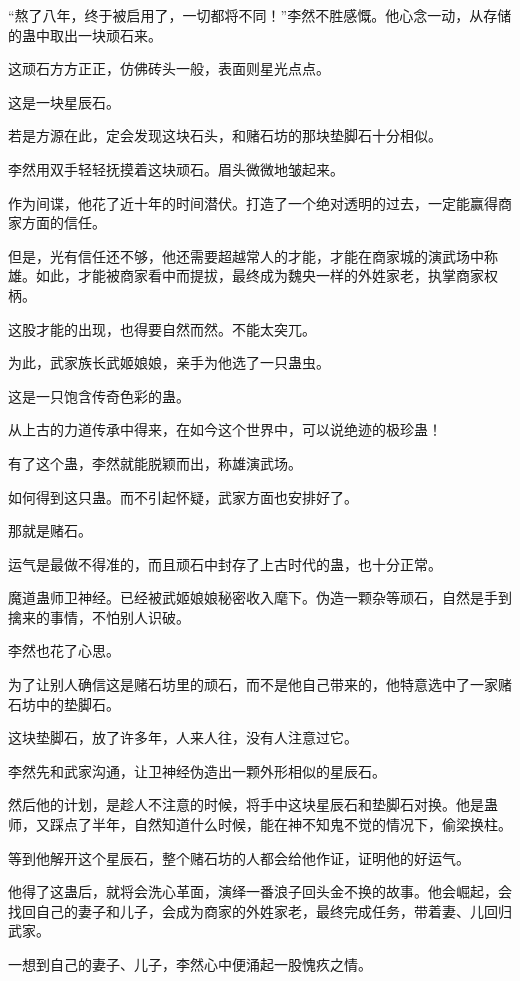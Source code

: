 \begin{this_body}
“熬了八年，终于被启用了，一切都将不同！”李然不胜感慨。他心念一动，从存储的蛊中取出一块顽石来。

这顽石方方正正，仿佛砖头一般，表面则星光点点。

这是一块星辰石。

若是方源在此，定会发现这块石头，和赌石坊的那块垫脚石十分相似。

李然用双手轻轻抚摸着这块顽石。眉头微微地皱起来。

作为间谍，他花了近十年的时间潜伏。打造了一个绝对透明的过去，一定能赢得商家方面的信任。

但是，光有信任还不够，他还需要超越常人的才能，才能在商家城的演武场中称雄。如此，才能被商家看中而提拔，最终成为魏央一样的外姓家老，执掌商家权柄。

这股才能的出现，也得要自然而然。不能太突兀。

为此，武家族长武姬娘娘，亲手为他选了一只蛊虫。

这是一只饱含传奇色彩的蛊。

从上古的力道传承中得来，在如今这个世界中，可以说绝迹的极珍蛊！

有了这个蛊，李然就能脱颖而出，称雄演武场。

如何得到这只蛊。而不引起怀疑，武家方面也安排好了。

那就是赌石。

运气是最做不得准的，而且顽石中封存了上古时代的蛊，也十分正常。

魔道蛊师卫神经。已经被武姬娘娘秘密收入麾下。伪造一颗杂等顽石，自然是手到擒来的事情，不怕别人识破。

李然也花了心思。

为了让别人确信这是赌石坊里的顽石，而不是他自己带来的，他特意选中了一家赌石坊中的垫脚石。

这块垫脚石，放了许多年，人来人往，没有人注意过它。

李然先和武家沟通，让卫神经伪造出一颗外形相似的星辰石。

然后他的计划，是趁人不注意的时候，将手中这块星辰石和垫脚石对换。他是蛊师，又踩点了半年，自然知道什么时候，能在神不知鬼不觉的情况下，偷梁换柱。

等到他解开这个星辰石，整个赌石坊的人都会给他作证，证明他的好运气。

他得了这蛊后，就将会洗心革面，演绎一番浪子回头金不换的故事。他会崛起，会找回自己的妻子和儿子，会成为商家的外姓家老，最终完成任务，带着妻、儿回归武家。

一想到自己的妻子、儿子，李然心中便涌起一股愧疚之情。


\end{this_body}
